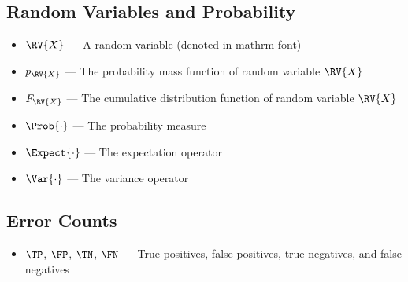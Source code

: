 \subsection{Random Variables and Probability}
\begin{itemize}
  \item $\RV{X}$ --- A random variable (denoted in mathrm font)
  \item $p_{\RV{X}}$ --- The probability mass function of random variable $\RV{X}$
  \item $F_{\RV{X}}$ --- The cumulative distribution function of random variable $\RV{X}$
  \item $\Prob{\cdot}$ --- The probability measure
  \item $\Expect{\cdot}$ --- The expectation operator
  \item $\Var{\cdot}$ --- The variance operator
\end{itemize}

\subsection{Error Counts}
\begin{itemize}
  \item $\TP$, $\FP$, $\TN$, $\FN$ --- True positives, false positives, true negatives, and false negatives
\end{itemize}

